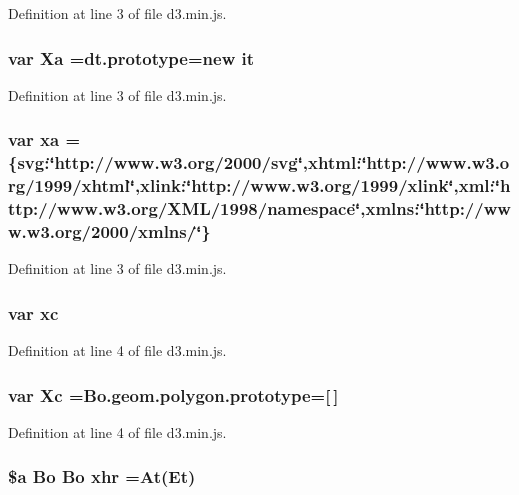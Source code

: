 Definition at line 3 of file d3.\+min.\+js.

\subsubsection[{Xa}]{\setlength{\rightskip}{0pt plus 5cm}var Xa ={\bf dt.\+prototype}=new it}\label{d3_8min_8js_a0d140c953e1ecb2ab4d6f26955281ae0}


Definition at line 3 of file d3.\+min.\+js.

\subsubsection[{xa}]{\setlength{\rightskip}{0pt plus 5cm}var xa =\{svg\+:\char`\"{}http\+://www.\+w3.\+org/2000/{\bf svg}\char`\"{},xhtml\+:\char`\"{}http\+://www.\+w3.\+org/1999/xhtml\char`\"{},xlink\+:\char`\"{}http\+://www.\+w3.\+org/1999/xlink\char`\"{},xml\+:\char`\"{}http\+://www.\+w3.\+org/X\+M\+L/1998/namespace\char`\"{},xmlns\+:\char`\"{}http\+://www.\+w3.\+org/2000/xmlns/\char`\"{}\}}\label{d3_8min_8js_aeb73042bd1909997e1cf54aa38d29dfe}


Definition at line 3 of file d3.\+min.\+js.

\subsubsection[{xc}]{\setlength{\rightskip}{0pt plus 5cm}var xc}\label{d3_8min_8js_afcc987adcc8d79386dca26e19348d22f}


Definition at line 4 of file d3.\+min.\+js.

\subsubsection[{Xc}]{\setlength{\rightskip}{0pt plus 5cm}var Xc ={\bf Bo.\+geom.\+polygon.\+prototype}=[$\,$]}\label{d3_8min_8js_a919d8dd400c8fa3d16f25748aa430b98}


Definition at line 4 of file d3.\+min.\+js.

\subsubsection[{xhr}]{\setlength{\rightskip}{0pt plus 5cm}\${\bf a} {\bf Bo} {\bf Bo} xhr =At(Et)}\label{d3_8min_8js_ad8cd12127ef0d3ac40b326fa40882576}


